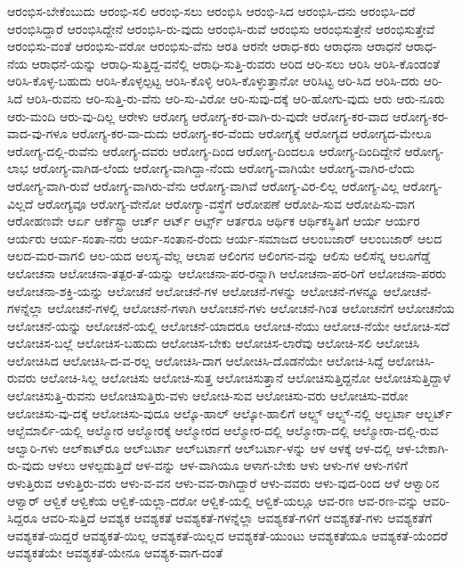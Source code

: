 {ಆರಂಭಿಸ-ಬೇಕೆಂಬುದು
ಆರಂಭಿ-ಸಲಿ
ಆರಂಭಿ-ಸಲು
ಆರಂಭಿಸಿ
ಆರಂಭಿ-ಸಿದ
ಆರಂಭಿಸಿ-ದನು
ಆರಂಭಿಸಿ-ದರೆ
ಆರಂಭಿಸಿದ್ದಾರೆ
ಆರಂಭಿಸಿದ್ದೇನೆ
ಆರಂಭಿಸಿ-ರು-ವುದು
ಆರಂಭಿಸಿ-ರುವೆ
ಆರಂಭಿಸು
ಆರಂಭಿಸುತ್ತೇನೆ
ಆರಂಭಿಸುತ್ತೇವೆ
ಆರಂಭಿಸು-ವಂತೆ
ಆರಂಭಿಸು-ವರೋ
ಆರಂಭಿಸು-ವೆನು
ಆರತಿ
ಆರನೇ
ಆರಾಧ-ಕರು
ಆರಾಧನಾ
ಆರಾಧನೆ
ಆರಾಧ-ನೆಯ
ಆರಾಧನೆ-ಯನ್ನು
ಆರಾಧಿ-ಸುತ್ತಿದ್ದ-ವನೆಲ್ಲಿ
ಆರಾಧಿ-ಸುತ್ತಿ-ರುವರು
ಆರಿದ
ಆರಿ-ಸಲು
ಆರಿಸಿ
ಆರಿಸಿ-ಕೊಂಡಂತೆ
ಆರಿಸಿ-ಕೊಳ್ಳ-ಬಹುದು
ಆರಿಸಿ-ಕೊಳ್ಳಲ್ಪಟ್ಟ
ಆರಿಸಿ-ಕೊಳ್ಳಿ
ಆರಿಸಿ-ಕೊಳ್ಳುತ್ತಾನೋ
ಆರಿಸಿಟ್ಟ
ಆರಿ-ಸಿದ
ಆರಿಸಿ-ದರು
ಆರಿ-ಸಿದೆ
ಆರಿಸಿ-ರುವನು
ಆರಿ-ಸುತ್ತಿ-ರು-ವೆನು
ಆರಿ-ಸು-ವಿರೋ
ಆರಿ-ಸುವು-ದಕ್ಕೆ
ಆರಿ-ಹೋಗು-ವುದು
ಆರು
ಆರು-ನೂರು
ಆರು-ಮಂದಿ
ಆರು-ವು-ದಿಲ್ಲ
ಆರೇಳು
ಆರೋಗ್ಯ
ಆರೋಗ್ಯ-ಕರ-ವಾಗಿ-ರು-ವುದೇ
ಆರೋಗ್ಯ-ಕರ-ವಾದ
ಆರೋಗ್ಯ-ಕರ-ವಾದ-ವು-ಗಳೂ
ಆರೋಗ್ಯ-ಕರ-ವಾ-ದುದು
ಆರೋಗ್ಯ-ಕರ-ವೆಂದು
ಆರೋಗ್ಯಕ್ಕೆ
ಆರೋಗ್ಯದ
ಆರೋಗ್ಯದ-ಮೇಲೂ
ಆರೋಗ್ಯ-ದಲ್ಲಿ-ರುವೆನು
ಆರೋಗ್ಯ-ದವರು
ಆರೋಗ್ಯ-ದಿಂದ
ಆರೋಗ್ಯ-ದಿಂದಲೂ
ಆರೋಗ್ಯ-ದಿಂದಿದ್ದೇನೆ
ಆರೋಗ್ಯ-ಲಾಭ
ಆರೋಗ್ಯ-ವಾಗಿಡ-ಲೆಂದು
ಆರೋಗ್ಯ-ವಾಗಿದ್ದಾ-ನೆಂದು
ಆರೋಗ್ಯ-ವಾಗಿಯೇ
ಆರೋಗ್ಯ-ವಾಗಿರ-ಲೆಂದು
ಆರೋಗ್ಯ-ವಾಗಿ-ರುವೆ
ಆರೋಗ್ಯ-ವಾಗಿರು-ವೆನು
ಆರೋಗ್ಯ-ವಾಗಿವೆ
ಆರೋಗ್ಯ-ವಿರ-ಲಿಲ್ಲ
ಆರೋಗ್ಯ-ವಿಲ್ಲ
ಆರೋಗ್ಯ-ವಿಲ್ಲದೆ
ಆರೋಗ್ಯವೂ
ಆರೋಗ್ಯ-ವೇನೋ
ಆರೋಗ್ಯಾ-ವಸ್ಥೆಗೆ
ಆರೋಪಣೆ
ಆರೋಪಿ-ಸುವ
ಆರೋಪಿಸು-ವಾಗ
ಆರೋಹಣವೇ
ಆರ್ಏ
ಆರ್ಕೆಸ್ಟ್ರಾ
ಆರ್ಚ್
ಆರ್ಟ್
ಆರ್ಟ್ಸ್
ಆರ್ತರೂ
ಆರ್ಥಿಕ
ಆರ್ಥಿಕಸ್ಥಿತಿಗೆ
ಆರ್ಯ
ಆರ್ಯರ
ಆರ್ಯರು
ಆರ್ಯ-ಸಂತಾ-ನರು
ಆರ್ಯ-ಸಂತಾನ-ರೆಂದು
ಆರ್ಯ-ಸಮಾಜದ
ಆಲಂಬಜಾರ್
ಆಲಂಬಜಾರ್‌
ಆಲದ
ಆಲದ-ಮರ-ವಾಗಲಿ
ಆಲ-ಯದ
ಆಲಸ್ಯ-ವೆಲ್ಲ
ಆಲಾಪ
ಆಲಿಂಗನ
ಆಲಿಂಗನ-ವನ್ನು
ಆಲಿಸು
ಆಲಿಸೆನ್ನ
ಆಲೂಗೆಡ್ಡೆ
ಆಲೋಚನಾ
ಆಲೋಚನಾ-ತತ್ಪರ-ತೆ-ಯನ್ನು
ಆಲೋಚನಾ-ಪರ-ರನ್ನಾಗಿ
ಆಲೋಚನಾ-ಪರ-ರಿಗೆ
ಆಲೋಚನಾ-ಪರರು
ಆಲೋಚನಾ-ಶಕ್ತಿ-ಯನ್ನು
ಆಲೋಚನೆ
ಆಲೋಚನೆ-ಗಳ
ಆಲೋಚನೆ-ಗಳನ್ನು
ಆಲೋಚನೆ-ಗಳನ್ನೂ
ಆಲೋಚನೆ-ಗಳನ್ನೆಲ್ಲಾ
ಆಲೋಚನೆ-ಗಳಲ್ಲಿ
ಆಲೋಚನೆ-ಗಳಾಗಿ
ಆಲೋಚನೆ-ಗಳು
ಆಲೋಚನೆ-ಗಿಂತ
ಆಲೋಚನೆಗೆ
ಆಲೋಚನೆಯ
ಆಲೋಚನೆ-ಯನ್ನು
ಆಲೋಚನೆ-ಯಲ್ಲಿ
ಆಲೋಚನೆ-ಯಾದರೂ
ಆಲೋಚ-ನೆಯು
ಆಲೋಚ-ನೆಯೇ
ಆಲೋಚಿ-ಸದೆ
ಆಲೋಚಿಸ-ಬಲ್ಲೆ
ಆಲೋಚಿಸ-ಬಹುದು
ಆಲೋಚಿಸ-ಬೇಕು
ಆಲೋಚಿಸ-ಲಾರೆವು
ಆಲೋಚಿ-ಸಲಿ
ಆಲೋಚಿಸಿ
ಆಲೋಚಿಸಿದ
ಆಲೋಚಿಸಿ-ದ-ವ-ರಲ್ಲ
ಆಲೋಚಿಸಿ-ದಾಗ
ಆಲೋಚಿಸಿ-ದೊಡನೆಯೇ
ಆಲೋಚಿ-ಸಿದ್ದೆ
ಆಲೋಚಿಸಿ-ರುವರು
ಆಲೋಚಿ-ಸಿಲ್ಲ
ಆಲೋಚಿಸು
ಆಲೋಚಿ-ಸುತ್ತ
ಆಲೋಚಿಸುತ್ತಾನೆ
ಆಲೋಚಿಸುತ್ತಿದ್ದನೋ
ಆಲೋಚಿಸುತ್ತಿದ್ದಾಳೆ
ಆಲೋಚಿಸುತ್ತಿ-ರುವನು
ಆಲೋಚಿಸುತ್ತಿರು-ವಳು
ಆಲೋಚಿ-ಸುವ
ಆಲೋಚಿಸು-ವರು
ಆಲೋಚಿಸು-ವರೋ
ಆಲೋಚಿಸು-ವು-ದಕ್ಕೆ
ಆಲೋಚಿಸು-ವುದೂ
ಆಲ್ಕೊ-ಹಾಲ್
ಆಲ್ಕೋ-ಹಾಲಿಗೆ
ಆಲ್ಪ್ಸ್
ಆಲ್ಪ್ಸ್‌-ನಲ್ಲಿ
ಆಲ್ಬರ್ಟಾ
ಆಲ್ಬರ್ಟ್
ಆಲ್ಬೆಮಾರ್ಲಿ-ಯಲ್ಲಿ
ಆಲ್ಮೋರ
ಆಲ್ಮೋರಕ್ಕೆ
ಆಲ್ಮೋರದ
ಆಲ್ಮೋರ-ದಲ್ಲಿ
ಆಲ್ಮೋರಾ-ದಲ್ಲಿ
ಆಲ್ಮೋರಾ-ದಲ್ಲಿ-ರುವ
ಆಲ್ವಾರಿ-ಗಳು
ಆಲ್‌ಕಾಟ್‌ರೂ
ಆಲ್‌ಬರ್ಟಾ
ಆಲ್‌ಬರ್ಟಾಗೆ
ಆಲ್‌ಬರ್ಟಾ-ಳನ್ನು
ಆಳ
ಆಳಕ್ಕೆ
ಆಳ-ದಲ್ಲಿ
ಆಳ-ಬೇಕಾಗಿ-ರು-ವುದು
ಆಳಲು
ಆಳಲ್ಪಡುತ್ತಿದೆ
ಆಳ-ವನ್ನು
ಆಳ-ವಾಗಿಯೂ
ಆಳಾಗ-ಬೇಕು
ಆಳು
ಆಳು-ಗಳ
ಆಳು-ಗಳಿಗೆ
ಆಳುತ್ತಿರುವ
ಆಳುತ್ತಿರು-ವರು
ಆಳು-ವ-ವನ
ಆಳು-ವವ-ರಾಗಿದ್ದಾರೆ
ಆಳು-ವವರು
ಆಳು-ವುದ-ರಿಂದ
ಆಳೆ
ಆಳ್ವಾರಿನ
ಆಳ್ವಾರ್
ಆಳ್ವಿಕೆ
ಆಳ್ವಿಕೆಯ
ಆಳ್ವಿಕೆ-ಯಲ್ಲಾ-ದರೋ
ಆಳ್ವಿಕೆ-ಯಲ್ಲಿ
ಆಳ್ವಿಕೆ-ಯಲ್ಲೂ
ಆವ-ರಣ
ಆವ-ರಣ-ವನ್ನು
ಆವರಿ-ಸಿದ್ದರೂ
ಆವರಿ-ಸುತ್ತಿದೆ
ಆವಶ್ಯಕ
ಆವಶ್ಯಕತೆ
ಆವಶ್ಯಕತೆ-ಗಳನ್ನೆಲ್ಲಾ
ಆವಶ್ಯಕತೆ-ಗಳಿಗೆ
ಆವಶ್ಯಕತೆ-ಗಳು
ಆವಶ್ಯಕತೆಗೆ
ಆವಶ್ಯಕತೆ-ಯಿದ್ದರೆ
ಆವಶ್ಯಕತೆ-ಯಿಲ್ಲ
ಆವಶ್ಯಕತೆ-ಯಿಲ್ಲದ
ಆವಶ್ಯಕತೆ-ಯುಂಟು
ಆವಶ್ಯಕತೆಯೂ
ಆವಶ್ಯಕತೆ-ಯೆಂದರೆ
ಆವಶ್ಯಕತೆಯೇ
ಆವಶ್ಯಕತೆ-ಯೇನೂ
ಆವಶ್ಯಕ-ವಾಗ-ದಂತೆ
}
